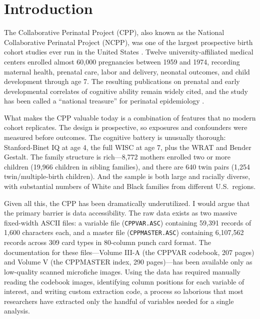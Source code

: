 \documentclass[12pt]{article}
\begin{document}
\doublespacing

\newpage
\section{Introduction}

The Collaborative Perinatal Project (CPP), also known as the National Collaborative Perinatal Project (NCPP), was one of the largest prospective birth cohort studies ever run in the United States \citep{niswander1972}. Twelve university-affiliated medical centers enrolled almost 60,000 pregnancies between 1959 and 1974, recording maternal health, prenatal care, labor and delivery, neonatal outcomes, and child development through age 7. The resulting publications on prenatal and early developmental correlates of cognitive ability \citep{broman1975, broman1987} remain widely cited, and the study has been called a ``national treasure'' for perinatal epidemiology \citep{hardy2003}.

What makes the CPP valuable today is a combination of features that no modern cohort replicates. The design is prospective, so exposures and confounders were measured before outcomes. The cognitive battery is unusually thorough: Stanford-Binet IQ at age 4, the full WISC at age 7, plus the WRAT and Bender Gestalt. The family structure is rich---8,772 mothers enrolled two or more children (19,966 children in sibling families), and there are 640 twin pairs (1,254 twin/multiple-birth children). And the sample is both large and racially diverse, with substantial numbers of White and Black families from different U.S.\ regions.

Given all this, the CPP has been dramatically underutilized. I would argue that the primary barrier is data accessibility. The raw data exists as two massive fixed-width ASCII files: a variable file (\texttt{CPPVAR.ASC}) containing 59,391 records of 1,600 characters each, and a master file (\texttt{CPPMASTER.ASC}) containing 6,107,562 records across 309 card types in 80-column punch card format. The documentation for these files---Volume III-A (the CPPVAR codebook, 207 pages) and Volume V (the CPPMASTER index, 290 pages)---has been available only as low-quality scanned microfiche images. Using the data has required manually reading the codebook images, identifying column positions for each variable of interest, and writing custom extraction code, a process so laborious that most researchers have extracted only the handful of variables needed for a single analysis.
\end{document}
